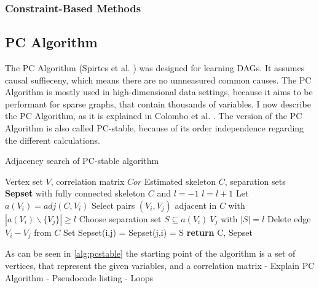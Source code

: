 \subsubsection{Constraint-Based Methods}



\subsection{PC Algorithm}
The PC Algorithm (Spirtes et al. \cite{spirtes_causation_1993}) was designed for learning DAGs. It assumes causal suffieceny, which means there are no umneasured common causes. The PC Algorithm is mostly used in high-dimensional data settings, because it aims to be performant for sparse graphs, that contain thousands of variables. \cite{kalisch_understanding_2010}
I now describe the PC Algorithm, as it is explained in Colombo et al. \cite{colombo_order-independent_nodate}. The version of the PC Algorithm is also called PC-stable, because of its order independence regarding the different calculations.

\begin{algorithm}
    \caption{Adjacency search of PC-stable algorithm \cite{colombo_order-independent_nodate}}
    \label{alg:pcstable}
    \begin{algorithmic}[1]
    \Require Vertex set $V$, correlation matrix $Cor$
    \Ensure Estimated skeleton $C$, separation sets \textbf{Sepset}
    \State with fully connected skeleton $C$ and $l = -1$
    \Repeat 
        \State $l=l+1$
            \State Let $a(V_i) = adj(C,V_i)$
        \EndFor
        \Repeat
            \State Select pairs $(V_i,V_j)$ adjacent in $C$ with $|a(V_i)\backslash\{V_j\}| \geq l$
            \Repeat
                \State Choose separation set $S \subseteq a(V_i ) \ {V_j }$ with $| S | = l$
                    \State Delete edge $V_i - V_j$ from $C$
                    \State Set Sepset(i,j) = Sepset(j,i) = S
                \EndIf
    \State \textbf{return} C, Sepset
    \end{algorithmic}
\end{algorithm}

As can be seen in \ref{alg:pcstable} the starting point of the algorithm is a set of vertices, that represent the given variables, and a correlation matrix 
- Explain PC Algorithm
- Pseudocode listing
- Loops